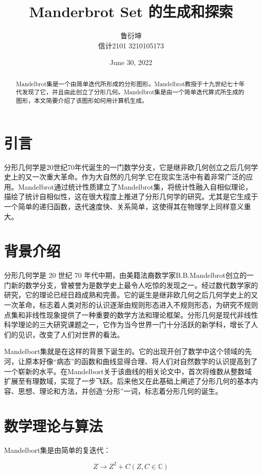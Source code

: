 \documentclass[UTF8]{article}
\title{Manderbrot Set 的生成和探索}
\author{鲁衍坤 \\ 信计2101 3210105173}
\date{June 30, 2022}
\begin{document}
\maketitle

\begin{abstract}
Mandelbrot集是一个由简单迭代所形成的分形图形。Mandelbrot教授于十九世纪七十年代发现了它，并且由此创立了分形几何。Mandelbrot集是由一个简单迭代算式所生成的图形，本文简要介绍了该图形如何用计算机生成。
\end{abstract}

\section{引言}
分形几何学是20世纪70年代诞生的一门数学分支，它是继非欧几何创立之后几何学史上的又一次重大革命。作为大自然的几何学,它在现实生活中有着非常广泛的应用。Mandelbrot通过统计性质建立了Mandelbrot集，将统计性融入自相似理论，描绘了统计自相似性，这在很大程度上推进了分形几何学的研究。尤其是它生成于一个简单的递归函数，迭代速度快、关系简单，这使得其在物理学上同样意义重大。

\section{背景介绍}
分形几何学是 20 世纪 70 年代中期，由美籍法裔数学家B.B.Mandelbrot创立的一门新的数学分支，曾被誉为是数学史上最令人吃惊的发现之一。经过数代数学家的研究，它的理论已经日趋成熟和完善。它的诞生是继非欧几何之后几何学史上的又一次革命，标志着人类对形的认识逐渐由规则形态进入不规则形态，为研究不规则点集和非线性现象提供了一种重要的数学方法和理论框架。分形几何是现代非线性科学理论的三大研究课题之一，它作为当今世界一门十分活跃的新学科，增长了人们的见识，改变了人们对世界的看法。\cite{CT_Mand2}

Mandelbort集就是在这样的背景下诞生的。它的出现开创了数学中这个领域的先河，让原本好像“病态”的函数和曲线显得合理、将人们对自然数学的认识提高到了一个崭新的水平。在Mandelbort关于该曲线的相关论文中，首次将维数从整数域扩展至有理数域，实现了一步飞跃。后来他又在此基础上阐述了分形几何的基本内容、思想、理论和方法，并创造“分形”一词，标志着分形几何的诞生。

\section{数学理论与算法}
Mandelbort集是由简单的复迭代：

\begin{equation}
  Z \to Z^2 + C   (Z,C \in \mathbb{C})
  \label{eq::con}
\end{equation}
\end{document}
